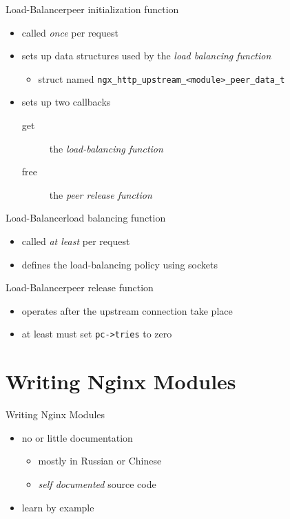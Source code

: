 \documentclass{beamer}
\begin{document}
\begin{frame}[fragile]{Load-Balancer}{peer initialization function}
\begin{itemize}
 \item called \emph{once} per request
 \item sets up data structures used by the \emph{load balancing function}
 \begin{itemize}
  \item struct named \verb|ngx_http_upstream_<module>_peer_data_t|
 \end{itemize}
 \item sets up two callbacks
 \begin{description}
  \item[get] the \emph{load-balancing function}
  \item[free] the \emph{peer release function}
 \end{description}
\end{itemize}
\end{frame}

\begin{frame}{Load-Balancer}{load balancing function}
\begin{itemize}
 \item called \emph{at least} per request
 \item defines the load-balancing policy using sockets
\end{itemize}
\end{frame}

\begin{frame}[fragile]{Load-Balancer}{peer release function}
\begin{itemize}
 \item operates after the upstream connection take place
 \item at least must set \verb|pc->tries| to zero
\end{itemize}
\end{frame}

\section{Writing Nginx Modules}
 
\begin{frame}{Writing Nginx Modules}
\begin{itemize}
 \item no or little documentation
 \begin{itemize}
  \item mostly in Russian or Chinese
  \item \emph{self documented} source code
 \end{itemize}
 \item learn by example
\end{itemize}
\end{frame}
\end{document}
